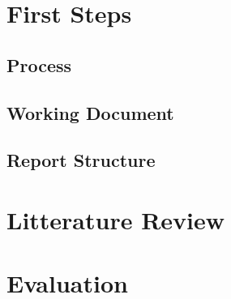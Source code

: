 \documentclass[a4paper]{memoir}
\begin{document}
\chapter{First Steps}

\section{Process}

\section{Working Document}

\section{Report Structure}

\chapter{Litterature Review}

\chapter{Evaluation}
\end{document}
